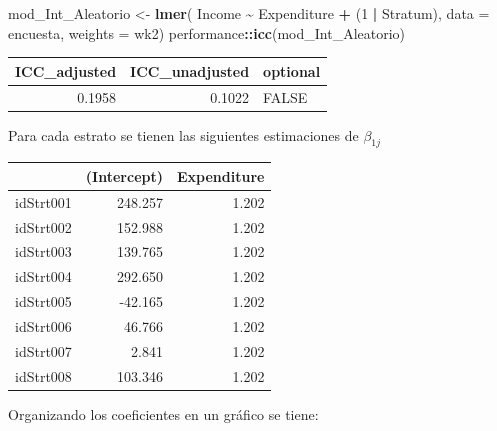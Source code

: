 \documentclass[
  spanish,
  12pt,
]{book}
\newenvironment{Shaded}{\begin{snugshade}}{\end{snugshade}}
\newcommand{\AttributeTok}[1]{\textcolor[rgb]{0.13,0.29,0.53}{#1}}
\newcommand{\DataTypeTok}[1]{\textcolor[rgb]{0.13,0.29,0.53}{#1}}
\newcommand{\DecValTok}[1]{\textcolor[rgb]{0.00,0.00,0.81}{#1}}
\newcommand{\FunctionTok}[1]{\textcolor[rgb]{0.13,0.29,0.53}{\textbf{#1}}}
\newcommand{\NormalTok}[1]{#1}
\newcommand{\OtherTok}[1]{\textcolor[rgb]{0.56,0.35,0.01}{#1}}
\newcommand{\SpecialCharTok}[1]{\textcolor[rgb]{0.81,0.36,0.00}{\textbf{#1}}}
\begin{document}
\begin{Shaded}
\begin{Highlighting}[]
\NormalTok{mod\_Int\_Aleatorio }\OtherTok{\textless{}{-}} \FunctionTok{lmer}\NormalTok{( Income }\SpecialCharTok{\textasciitilde{}}\NormalTok{ Expenditure  }\SpecialCharTok{+}\NormalTok{ (}\DecValTok{1} \SpecialCharTok{|}\NormalTok{ Stratum),}
  \AttributeTok{data =}\NormalTok{ encuesta, }\AttributeTok{weights  =}\NormalTok{  wk2)}
\NormalTok{performance}\SpecialCharTok{::}\FunctionTok{icc}\NormalTok{(mod\_Int\_Aleatorio)}
\end{Highlighting}
\end{Shaded}

\begin{tabular}{r|r|l}
\hline
ICC\_adjusted & ICC\_unadjusted & optional\\
\hline
0.1958 & 0.1022 & FALSE\\
\hline
\end{tabular}

Para cada estrato se tienen las siguientes estimaciones de \(\beta_{1j}\)

\begin{Shaded}
\end{Shaded}

\begin{tabular}{l|r|r}
\hline
  & (Intercept) & Expenditure\\
\hline
idStrt001 & 248.257 & 1.202\\
\hline
idStrt002 & 152.988 & 1.202\\
\hline
idStrt003 & 139.765 & 1.202\\
\hline
idStrt004 & 292.650 & 1.202\\
\hline
idStrt005 & -42.165 & 1.202\\
\hline
idStrt006 & 46.766 & 1.202\\
\hline
idStrt007 & 2.841 & 1.202\\
\hline
idStrt008 & 103.346 & 1.202\\
\hline
\end{tabular}

Organizando los coeficientes en un gráfico se tiene:
\end{document}
